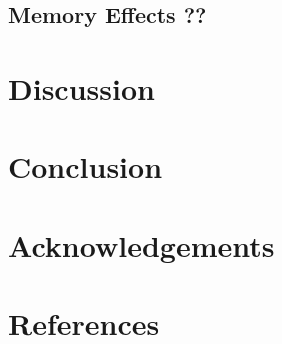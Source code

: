 \documentclass[a4paper, 12pt,oneside]{article}
\begin{document}
		\subsection{Memory Effects ??}

	\section{Discussion}
	\section{Conclusion}
	\section*{Acknowledgements}
	\section*{References}
\end{document}
